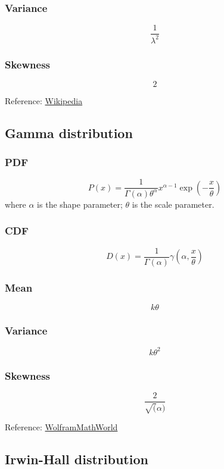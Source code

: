 \subsubsection*{Variance}
\[
    \frac{1}{\lambda^2}
\]

\subsubsection*{Skewness}
\[
    2
\]

Reference:
\href{https://en.wikipedia.org/wiki/Exponential_distribution}{Wikipedia}

\subsection{Gamma distribution}

\subsubsection*{PDF}
\[
    P(x)= \frac{1}{\Gamma(\alpha)\theta^{\alpha}} 
            x^{\alpha-1} \exp{(-\frac{x}{\theta})}
\]
where $\alpha$ is the shape parameter; $\theta$ is the scale parameter.

\subsubsection*{CDF}
\[
    D(x)= \frac{1}{\Gamma(\alpha)} \gamma(\alpha, \frac{x}{\theta})
\]

\subsubsection*{Mean}
\[
    k \theta
\]

\subsubsection*{Variance}
\[
    k \theta^2
\]

\subsubsection*{Skewness}
\[
    \frac{2}{\sqrt(\alpha)}
\]

Reference:
\href{https://mathworld.wolfram.com/GammaDistribution.html}{WolframMathWorld}

\subsection{Irwin-Hall distribution}

